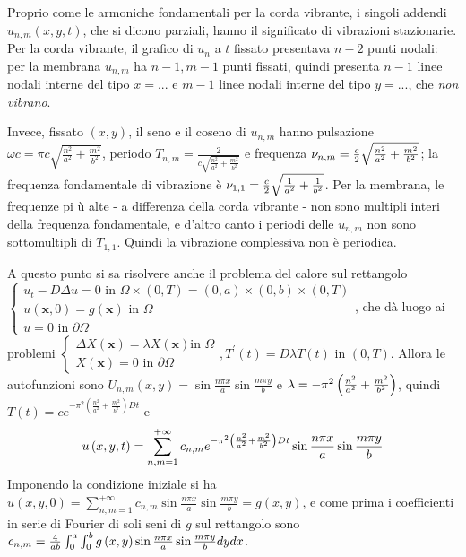 \documentclass{article}
\begin{document}
Proprio come le armoniche fondamentali per la corda vibrante, i singoli
addendi $u_{n,m}\left( x,y,t\right) $, che si dicono parziali, hanno il
significato di vibrazioni stazionarie. Per la corda vibrante, il grafico di $%
u_{n}$ a $t$ fissato presentava $n-2$ punti nodali: per la membrana $u_{n,m}$
ha $n-1,m-1$ punti fissati, quindi presenta $n-1$ linee nodali interne
del tipo $x=...$ e $m-1$ linee nodali interne del tipo $y=...$, che \textit{%
non vibrano}.

Invece, fissato $\left( x,y\right) $, il seno e il coseno di $u_{n,m}$ hanno
pulsazione $\omega c=\pi c\sqrt{\frac{n^{2}}{a^{2}}+\frac{m^{2}}{b^{2}}}$,
periodo $T_{n,m}=\frac{2}{c\sqrt{\frac{n^{2}}{a^{2}}+\frac{m^{2}}{b^{2}}}}$
e frequenza $\nu _{n,m}=\frac{c}{2}\sqrt{\frac{n^{2}}{a^{2}}+\frac{m^{2}}{%
b^{2}}}$; la frequenza fondamentale di vibrazione \`{e} $\nu _{1,1}=\frac{c}{%
2}\sqrt{\frac{1}{a^{2}}+\frac{1}{b^{2}}}$. Per la membrana, le frequenze pi%
\`{u} alte - a differenza della corda vibrante - non sono multipli interi
della frequenza fondamentale, e d'altro canto i periodi delle $u_{n,m}$ non
sono sottomultipli di $T_{1,1}$. Quindi la vibrazione complessiva non \`{e}
periodica.

A questo punto si sa risolvere anche il problema del calore sul rettangolo $%
\left\{ 
\begin{array}{c}
u_{t}-D\Delta u=0\text{ in }\Omega \times \left( 0,T\right) =\left(
0,a\right) \times \left( 0,b\right) \times \left( 0,T\right) \\ 
u\left( \mathbf{x},0\right) =g\left( \mathbf{x}\right) \text{ in }\Omega \\ 
u=0\text{ in }\partial \Omega%
\end{array}%
\right. $, che d\`{a} luogo ai problemi $\left\{ 
\begin{array}{c}
\Delta X\left( \mathbf{x}\right) =\lambda X\left( \mathbf{x}\right) \text{
in }\Omega \\ 
X\left( \mathbf{x}\right) =0\text{ in }\partial \Omega%
\end{array}%
\right. ,T^{\prime }\left( t\right) =D\lambda T\left( t\right) $ in $\left(
0,T\right) $. Allora le autofunzioni sono $U_{n,m}\left( x,y\right) =\sin 
\frac{n\pi x}{a}\sin \frac{m\pi y}{b}$ e $\lambda =-\pi ^{2}\left( \frac{%
n^{2}}{a^{2}}+\frac{m^{2}}{b^{2}}\right) $, quindi $T\left( t\right)
=ce^{-\pi ^{2}\left( \frac{n^{2}}{a^{2}}+\frac{m^{2}}{b^{2}}\right) Dt}$ e 
\begin{equation*}
u\left( x,y,t\right) =\sum_{n,m=1}^{+\infty }c_{n,m}e^{-\pi ^{2}\left( \frac{%
n^{2}}{a^{2}}+\frac{m^{2}}{b^{2}}\right) Dt}\sin \frac{n\pi x}{a}\sin \frac{%
m\pi y}{b} 
\end{equation*}
Imponendo la condizione iniziale si ha $u\left( x,y,0\right)
=\sum_{n,m=1}^{+\infty }c_{n,m}\sin \frac{n\pi x}{a}\sin \frac{m\pi y}{b}%
=g\left( x,y\right) $, e come prima i coefficienti in serie di Fourier di
soli seni di $g$ sul rettangolo sono $c_{n,m}=\frac{4}{ab}%
\int_{0}^{a}\int_{0}^{b}g\left( x,y\right) \sin \frac{n\pi x}{a}\sin \frac{%
m\pi y}{b}dydx$.
\end{document}
